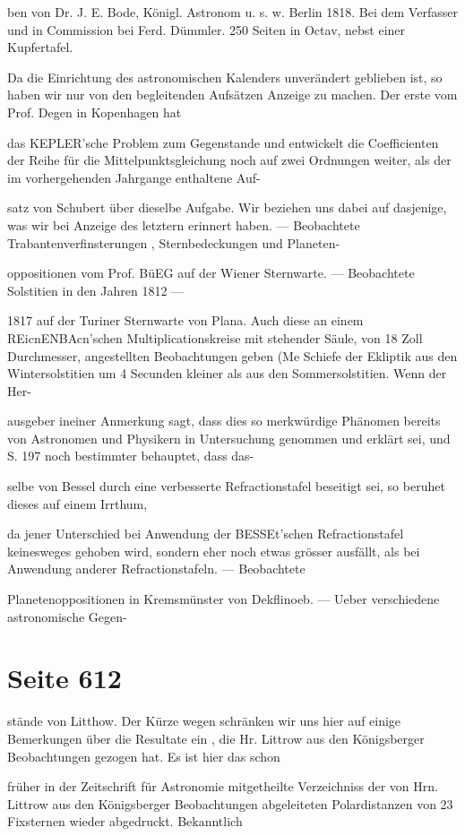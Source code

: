 \documentclass[10pt,a4paper]{article}
\begin{document}
ben von Dr. J. E. Bode, Königl. Astronom u. s. w. Berlin 1818. Bei dem Verfasser und in Commission bei Ferd. Dümmler. 250 Seiten in Octav, nebst einer Kupfertafel.

Da die Einrichtung des astronomischen Kalenders unverändert geblieben ist, so haben wir nur von den begleitenden Aufsätzen Anzeige zu machen. Der erste vom Prof. Degen in Kopenhagen hat

das KEPLER'sche Problem zum Gegenstande und entwickelt die Coefficienten der Reihe für die Mittelpunktsgleichung noch auf zwei Ordnungen weiter, als der im vorhergehenden Jahrgange enthaltene Auf-

satz von Schubert über dieselbe Aufgabe. Wir beziehen uns dabei auf dasjenige, was wir bei Anzeige des letztern erinnert haben. — Beobachtete Trabantenverfinsterungen , Sternbedeckungen und Planeten-

oppositionen vom Prof. BüEG auf der Wiener Sternwarte. — Beobachtete Solstitien in den Jahren 1812 —

1817 auf der Turiner Sternwarte von Plana. Auch diese an einem REicnENBAcn'schen Multiplicationskreise mit stehender Säule, von 18 Zoll Durchmesser, angestellten Beobachtungen geben (Me Schiefe der Ekliptik aus den Wintersolstitien um 4 Secunden kleiner als aus den Sommersolstitien. Wenn der Her-

ausgeber ineiner Anmerkung sagt, dass dies so merkwürdige Phänomen bereits von Astronomen und Physikern in Untersuchung genommen und erklärt sei, und S. 197 noch bestimmter behauptet, dass das-

selbe von Bessel durch eine verbesserte Refractionstafel beseitigt sei, so beruhet dieses auf einem Irrthum,

da jener Unterschied bei Anwendung der BESSEt'schen Refractionstafel keinesweges gehoben wird, sondern eher noch etwas grösser ausfällt, als bei Anwendung anderer Refractionstafeln. — Beobachtete

Planetenoppositionen in Kremsmünster von Dekflinoeb. — Ueber verschiedene astronomische Gegen-


\newpage
\section*{Seite 612}
stände von Litthow. Der Kürze wegen schränken wir uns hier auf einige Bemerkungen über die Resultate ein , die Hr. Littrow aus den Königsberger Beobachtungen gezogen hat. Es ist hier das schon

früher in der Zeitschrift für Astronomie mitgetheilte Verzeichniss der von Hrn. Littrow aus den Königsberger Beobachtungen abgeleiteten Polardistanzen von 23 Fixsternen wieder abgedruckt. Bekanntlich
\end{document}
